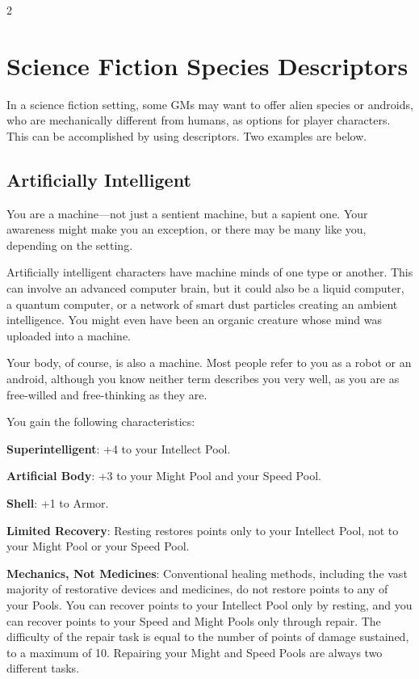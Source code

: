 \begin{multicols}{2}

\chapter{Science Fiction Species Descriptors}

In a science fiction setting, some GMs may want to offer alien species or androids, who are mechanically different from humans, as options for player characters. This can be accomplished by using descriptors. Two examples are below.

\section{Artificially Intelligent}

You are a machine—not just a sentient machine, but a sapient one. Your awareness might make you an exception, or there may be many like you, depending on the setting.

Artificially intelligent characters have machine minds of one type or another. This can involve an advanced computer brain, but it could also be a liquid computer, a quantum computer, or a network of smart dust particles creating an ambient intelligence. You might even have been an organic creature whose mind was uploaded into a machine.

Your body, of course, is also a machine. Most people refer to you as a robot or an android, although you know neither term describes you very well, as you are as free-willed and free-thinking as they are.

You gain the following characteristics:

\textbf{Superintelligent}: +4 to your Intellect Pool.

\textbf{Artificial Body}: +3 to your Might Pool and your Speed Pool.

\textbf{Shell}: +1 to Armor.

\textbf{Limited Recovery}: Resting restores points only to your Intellect Pool, not to your Might Pool or your Speed Pool.

\textbf{Mechanics, Not Medicines}: Conventional healing methods, including the vast majority of restorative devices and medicines, do not restore points to any of your Pools. You can recover points to your Intellect Pool only by resting, and you can recover points to your Speed and Might Pools only through repair. The difficulty of the repair task is equal to the number of points of damage sustained, to a maximum of 10. Repairing your Might and Speed Pools are always two different tasks.


\end{multicols}

